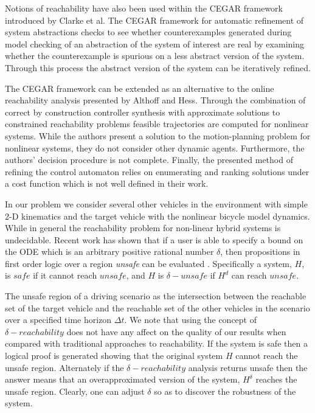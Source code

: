 Notions of reachability have also been used within the CEGAR framework introduced by Clarke et al. The CEGAR framework for automatic refinement of system abstractions checks to see whether counterexamples generated during model checking of an abstraction of the system of interest are real by examining  whether the counterexample is spurious on a less abstract version of the system. Through this process the abstract version of the system can be iteratively refined.\cite{Clarke2003}

The CEGAR framework can be extended as an alternative to the online reachability analysis presented by Althoff and Hess. Through the combination of correct by construction controller synthesis with approximate solutions to constrained reachability problems feasible trajectories are computed for nonlinear systems. While the authors present a solution to the motion-planning problem for nonlinear systems, they do not consider other dynamic agents. Furthermore, the authors' decision procedure is not complete. Finally, the presented method of refining the control automaton relies on enumerating and ranking solutions under a cost function which is not well defined in their work.\cite{Wolff2013}

In our problem we consider several other vehicles in the environment with simple 2-D kinematics and the target vehicle with the nonlinear bicycle model dynamics. While in general the reachability problem for non-linear hybrid systems is undecidable. Recent work has shown that if a user is able to specify a bound on the ODE which is an arbitrary positive rational number \(\delta\), then propositions in first order logic over a region \textit{unsafe} can be evaluated \cite{gao2014delta}. Specifically a system, \(H\), is \(safe\) if it cannot reach \(unsafe\), and \(H\) is \(\delta-unsafe\) if \(H^d\) can reach \(unsafe\). 

The unsafe region of a driving scenario as the intersection between the reachable set of the target vehicle and the reachable set of the other vehicles in the scenario over a specified time horizon \(\Delta t\). We note that using the concept of \(\delta-reachability\) does not have any affect on the quality of our results when compared with traditional approaches to reachability. If the system is safe then a logical proof is generated showing that the original system \(H\) cannot reach the unsafe region. Alternately if the \(\delta-reachability\) analysis returns unsafe then the answer means that an overapproximated version of the system, \(H^{\delta}\) reaches the unsafe region. Clearly, one can adjust \(\delta\) so as to discover the robustness of the system. 

